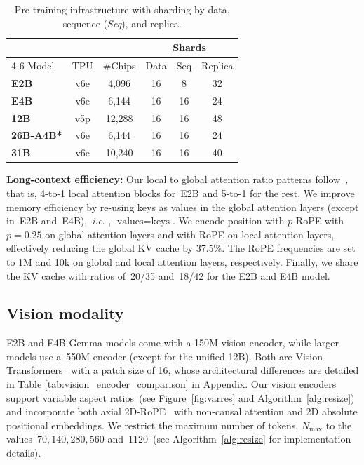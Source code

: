 \documentclass[11pt, a4paper, logo, twocolumn, copyright]{googledeepmind}
\newcommand{\ie}{\textit{i}.\textit{e}. }
\begin{document}
\begin{table}[h!]
 \setlength{\tabcolsep}{5pt}
    \centering
    \begin{tabular}{@{}l c c c c c@{}}
    \toprule
    & & & \multicolumn{3}{c}{Shards} \\
    \cmidrule{4-6}
    Model & TPU & \#Chips & Data & Seq & Replica \\
    \midrule
        \textbf{E2B} & v6e & 4,096 & 16 & 8 & 32 \\
        \textbf{E4B} & v6e & 6,144 & 16 & 16 & 24 \\
        \textbf{12B} & v5p & 12,288 & 16 & 16 & 48 \\
        \textbf{26B-A4B*} & v6e & 6,144 & 16 & 16 & 24 \\
        \textbf{31B} & v6e & 10,240 & 16 & 16 & 40 \\
    \bottomrule
    \end{tabular}
    \caption{Pre-training infrastructure with sharding by data, sequence (\textit{Seq}), and replica.}
    \label{tab:training_infra_sharding}
\end{table}


\noindent\textbf{Long-context efficiency:} Our local to global attention ratio patterns follow~\cite{gemmateam2025gemma}, that is, 4-to-1 local attention blocks for~E2B and 5-to-1 for the rest. We improve memory efficiency by re-using keys as values in the global attention layers (except in~E2B and~E4B),~\ie, $\text{values} = \text{keys}$. We encode position with $p$-RoPE with $p=0.25$ on global attention layers and with RoPE on local attention layers, effectively reducing the global KV cache by 37.5\%. The RoPE frequencies are set to 1M and 10k on global and local attention layers, respectively. Finally, we share the KV cache with ratios of~20/35 and~18/42 for the E2B and E4B model.



\vspace{-1em}
\subsection{Vision modality}

E2B and E4B Gemma models come with a 150M vision encoder, while larger models use a~550M encoder (except for the unified 12B). Both are Vision Transformers~\citep[ViT]{dosovitskiy2020image} with a patch size of 16, whose architectural differences are detailed in Table \ref{tab:vision_encoder_comparison} in Appendix.
Our vision encoders support variable aspect ratios~(see Figure~\ref{fig:varres} and Algorithm~\ref{alg:resize}) and incorporate both axial 2D-RoPE~\citep{heo2024rotary} with non-causal attention and 2D absolute positional embeddings. We restrict the maximum number of tokens, $N_\text{max}$ to the values~$70,140, 280, 560$ and~$1120$~(see Algorithm~\ref{alg:resize} for implementation details).
\end{document}
